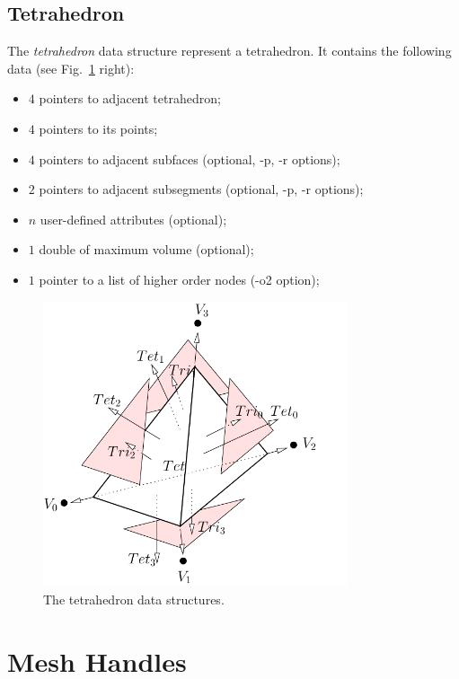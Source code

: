 \subsection{Tetrahedron}

The {\it tetrahedron} data structure represent a tetrahedron. It contains the following data (see Fig.~\ref{fig:tetrahedron} right):
\begin{itemize}
\item $4$ pointers to adjacent tetrahedron;
\item $4$ pointers to its points;
\item $4$ pointers to adjacent subfaces (optional, -p, -r options);
\item $2$ pointers to adjacent subsegments (optional, -p, -r options);
\item $n$ user-defined attributes (optional);
\item $1$ double of maximum volume (optional);
\item $1$ pointer to a list of higher order nodes (-o2 option);
\end{itemize}

\begin{figure}
  \centering
  \includegraphics[width=0.8\textwidth]{../figs/tetrahedron-based}
\caption{The tetrahedron data structures.}
\label{fig:tetrahedron}
\end{figure}

\section{Mesh Handles}

